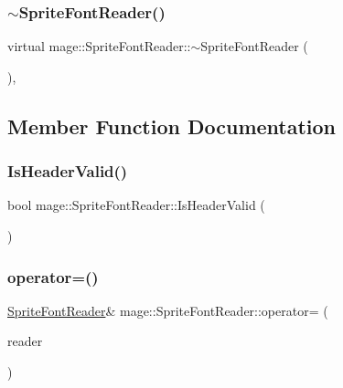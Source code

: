 \hypertarget{classmage_1_1_sprite_font_reader_a296715f88672f810a6e4b74f74840c53}{}\label{classmage_1_1_sprite_font_reader_a296715f88672f810a6e4b74f74840c53} 
\subsubsection{\texorpdfstring{$\sim$\+Sprite\+Font\+Reader()}{~SpriteFontReader()}}
{\footnotesize\ttfamily virtual mage\+::\+Sprite\+Font\+Reader\+::$\sim$\+Sprite\+Font\+Reader (\begin{DoxyParamCaption}{ }\end{DoxyParamCaption})\hspace{0.3cm}{\ttfamily [virtual]}, {\ttfamily [default]}}



\subsection{Member Function Documentation}
\hypertarget{classmage_1_1_sprite_font_reader_aa6dd3fc28e531d6db6ecda6ce3535d4c}{}\label{classmage_1_1_sprite_font_reader_aa6dd3fc28e531d6db6ecda6ce3535d4c} 
\subsubsection{\texorpdfstring{Is\+Header\+Valid()}{IsHeaderValid()}}
{\footnotesize\ttfamily bool mage\+::\+Sprite\+Font\+Reader\+::\+Is\+Header\+Valid (\begin{DoxyParamCaption}{ }\end{DoxyParamCaption})\hspace{0.3cm}{\ttfamily [private]}}

\hypertarget{classmage_1_1_sprite_font_reader_a4de55b4bebfabb5f1c32078864baef11}{}\label{classmage_1_1_sprite_font_reader_a4de55b4bebfabb5f1c32078864baef11} 
\subsubsection{\texorpdfstring{operator=()}{operator=()}\hspace{0.1cm}{\footnotesize\ttfamily [1/2]}}
{\footnotesize\ttfamily \hyperlink{classmage_1_1_sprite_font_reader}{Sprite\+Font\+Reader}\& mage\+::\+Sprite\+Font\+Reader\+::operator= (\begin{DoxyParamCaption}\item[{const \hyperlink{classmage_1_1_sprite_font_reader}{Sprite\+Font\+Reader} \&}]{reader }\end{DoxyParamCaption})\hspace{0.3cm}{\ttfamily [delete]}}

